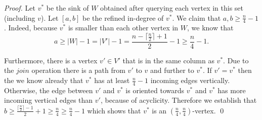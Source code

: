 \documentclass[runningheads,a4paper]{llncs}
\newcommand{\AT}[1]{\marginpar{\parbox{3.6cm}{{\small {\bf AT:} #1}}}} %
\newcommand{\indegree}{refined in-degree\xspace}
\begin{document}
\begin{proof}
Let $v^*$ be the sink of $W$ obtained after querying each vertex in this set (including $v$). Let $[a,b]$ be the \indegree of $v^*$. We claim that $a, b \geq \frac{n}{4} - 1$. 
Indeed, because $v^*$ is smaller than each other vertex in $W$, we know that $$a \geq |W|-1 = |V'|-1 = \frac{n-\lceil \frac{n}{2}\rceil + 1}{2} - 1 \geq \frac{n}{4} - 1.$$


Furthermore, there is a vertex $v' \in V'$ that is in the same column as $v^*$. Due to the $join$ operation there is a path from $v'$ to $v$ and further to $v^*$. 
If $v'=v^*$ then the we know already that $v^*$ has at least $\frac{n}{4} - 1$ incoming edges vertically.
Otherwise,  the edge between $v'$ and $v^*$ is oriented towards $v^*$ and $v^*$ has more incoming vertical edges than $v'$, because of acyclicity. Therefore we establish that $b \geq \frac{\lceil \frac{n}{2}\rceil-1}{2} + 1 \geq \frac{n}{4} \geq \frac{n}{4} - 1$ which shows that $v^*$ is an $(\frac{n}{4}, \frac{n}{4})$-vertex. \qed


   

\end{proof}
\end{document}
